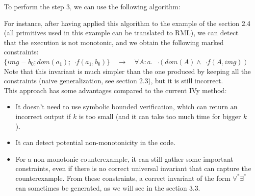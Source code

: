 \documentclass[11pt,a4paper,oldfontcommands,openany]{memoir}
\begin{document}
    To perform the step 3, we can use the following algorithm:

    \begin{algorithm}[H]
    \end{algorithm}\hfill

    For instance, after having applied this algorithm to the example of the section 2.4 (all primitives used in this example can be translated to RML),
    we can detect that the execution is not monotonic, and we obtain the following marked constraints:\\
    \(\{img=b_0 ; dom(a_1) ; \neg f(a_1,b_0)\} \quad \longrightarrow \quad \forall A:a.\ \neg (dom(A) \land \neg f(A,img))\)\\
    Note that this invariant is much simpler than the one produced by keeping all the constraints (naive generalization, see section 2.3), but it is still incorrect.\\

    This approach has some advantages compared to the current IVy method:
    \begin{itemize}
        \item It doesn't need to use symbolic bounded verification, which can return an incorrect output if \(k\) is too small (and it can take too much time for bigger \(k\)).
        \item It can detect potential non-monotonicity in the code.
        \item For a non-monotonic counterexample, it can still gather some important constraints, even if there is no correct universal invariant that can capture the counterexample.
        From these constraints, a correct invariant of the form \(\forall^*\exists^*\) can sometimes be generated, as we will see in the section 3.3.
    \end{itemize}
\end{document}
